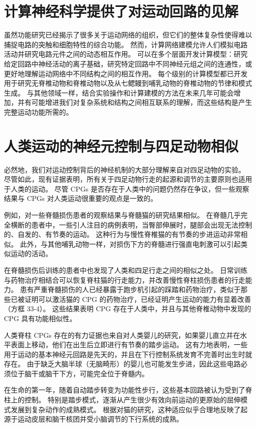 \section{计算神经科学提供了对运动回路的见解}

虽然功能研究已经揭示了很多关于运动网络的组织，但它们的整体复杂性使得难以捕捉电路的突触和细胞特性的综合功能。 然而，计算网络建模允许人们模拟电路活动并研究电路元件之间的动态相互作用。 可以在多个层面开发计算模型：研究给定回路中神经活动的离子基础，研究特定回路中不同神经元组之间的连通性，或更好地理解运动网络中不同结构之间的相互作用。 每个级别的计算模型都已开发用于研究无脊椎动物和脊椎动物以及从七鳃鳗到哺乳动物的脊椎动物的节律和模式生成。 与其他领域一样，结合实验操作和计算建模的方法在未来几年可能会增加，并有可能增进我们对复杂系统和结构之间相互联系的理解，而这些结构是产生完整运动功能所需的。


\section{人类运动的神经元控制与四足动物相似}

必然地，我们对运动控制背后的神经机制的大部分理解来自对四足动物的实验。 尽管如此，现有证据表明，所有关于四足动物行走的起源和调节的主要原则也适用于人类的运动。 尽管 CPGs 是否存在于人类中的问题仍然存在争议，但一些观察结果与 CPGs 对人类运动很重要的观点是一致的。

例如，对一些脊髓损伤患者的观察结果与脊髓猫的研究结果相似。 在脊髓几乎完全横断的患者中，一些引人注目的病例表明，当臀部伸展时，腿部会出现无法控制的、自发的、有节奏的运动。 这种行为与慢性脊椎猫的有节奏的步进运动非常相似。 此外，与其他哺乳动物一样，对损伤下方的脊髓进行强直电刺激可以引起类似运动的活动。

在脊髓损伤后训练的患者中也发现了人类和四足行走之间的相似之处。 日常训练与药物治疗相结合可以恢复脊柱猫的行走能力，并改善慢性脊柱损伤患者的行走能力。 患有严重脊髓损伤的人已经暴露于跑步机引起的踩踏和药物治疗，类似于那些已被证明可以激活猫的 CPG 的药物治疗，已经证明产生运动的能力有显着改善（方框 33-4）。 这些结果表明 CPG 存在于人类中，并且与其他脊椎动物中发现的 CPG 具有功能相似性。

人类脊柱 CPGs 存在的有力证据也来自对人类婴儿的研究，如果婴儿直立并在水平表面上移动，他们在出生后立即进行有节奏的踏步运动。 这有力地表明，一些用于运动的基本神经元回路是先天的，并且在下行控制系统发育不完善时出生时就存在。 由于缺乏大脑半球（无脑畸形）的婴儿也可能发生步进，因此这些电路必须位于脑干或脑干下方，可能完全位于脊髓内。

在生命的第一年，随着自动踏步转变为功能性步行，这些基本回路被认为受到了脊柱上的控制。 特别是踏步模式，逐渐从产生很少有效向前运动的更原始的屈伸模式发展到复杂动作的成熟模式。 根据对猫的研究，这种适应似乎合理地反映了起源于运动皮层和脑干核团并受小脑调节的下行系统的成熟。

